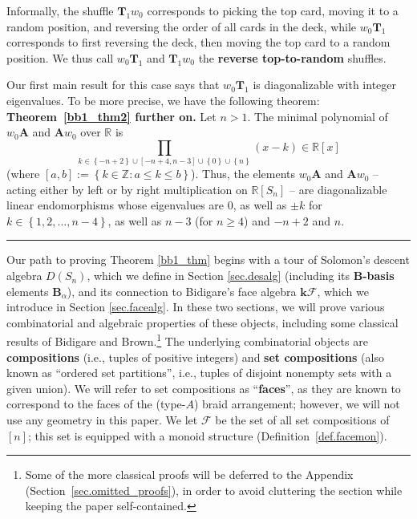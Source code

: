 \documentclass[12pt]{article}
\theoremstyle{definition}%
\newtheorem{thm}{Theorem}[section]
\theoremstyle{definition}%
\theoremstyle{remark}%
\newcommand{\tup}[1]{\left( #1 \right)}
\newcommand{\sbr}[1]{\left[ #1 \right]} %
\newcommand{\interval}[1]{\left[ #1 \right]} %
\newcommand{\set}[1]{\left\{ #1 \right\}}
\newcommand{\ZZ}{\mathbb{Z}}
\newcommand{\RR}{\mathbb{R}}
\newcommand{\kk}{\mathbf{k}}
\newcommand{\kf}{\kk\mathcal{F}}
\newcommand{\dsn}{D\left(S_n\right)}
\newcommand{\A}{\mathbf{A}}
\newcommand{\BBa}{\mathbf{B}_{\alpha}}
\newcommand{\TT}{\mathbf{T}}
\newcommand{\CF}{\mathcal{F}}
\newcommand{\wo}{w_0} %
\newcommand{\defin}[1]{\textbf{#1}}
\newenvironment{thm}[1][Theorem]{\noindent\textbf{#1.} }{\ \rule{0.5em}{0.5em}}
\begin{document}
Informally, the shuffle $\TT_1\wo$ corresponds to picking the top card, moving it to a random position, and reversing the order of all cards in the deck, while $\wo\TT_1$ corresponds to first reversing the deck, then moving the top card to a random position.
We thus call $ \wo\TT_{1} $ and $ \TT_{1}\wo $ the \defin{reverse top-to-random} shuffles.

Our first main result for this case says that $ \wo\TT_1 $ is diagonalizable with integer eigenvalues. To be more precise, we have the following theorem:
\begin{thm}[Theorem~\ref{bb1_thm2} further on]
    \label{bb1_thm}
    Let $n > 1$. The minimal polynomial of $ \wo\A $ and $ \A\wo $ over $\RR$ is
    \begin{equation}
    \label{bb1_thm.eq}
    \prod_{k \in \set{-n+2} \cup \interval{-n+4, n-3} \cup \set{0} \cup \set{n}} \tup{x-k} \in \RR\sbr{x}
    \end{equation}
(where $\interval{a,b} := \set{k \in \ZZ : a \le k \le b}$).
Thus, the elements $\wo\A$ and $\A\wo$ -- acting either by left or by right multiplication on $\RR[S_n]$ -- are diagonalizable linear endomorphisms whose eigenvalues are $0$, as well as $\pm k$ for $k \in \set{1,2,\ldots,n-4}$, as well as $n-3$ (for $n \geq 4$) and $-n+2$ and $n$.
\end{thm}


Our path to proving Theorem \ref{bb1_thm} begins with a tour of Solomon's descent algebra $\dsn$, which we define in Section \ref{sec.desalg} (including its \defin{B-basis} elements $\BBa$), and its connection to Bidigare's face algebra $ \kf $, which we introduce in Section \ref{sec.facealg}.
In these two sections, we will prove various combinatorial and algebraic properties of these objects, including some classical results of Bidigare and Brown.\footnote{Some of the more classical proofs will be deferred to the Appendix (Section~\ref{sec.omitted_proofs}), in order to avoid cluttering the section while keeping the paper self-contained.}
The underlying combinatorial objects are \defin{compositions} (i.e., tuples of positive integers) and \defin{set compositions} (also known as ``ordered set partitions'', i.e., tuples of disjoint nonempty sets with a given union).
We will refer to set compositions as ``\defin{faces}'', as they are known to correspond to the faces of the (type-$A$) braid arrangement; however, we will not use any geometry in this paper.
We let $\CF$ be the set of all set compositions of $\interval{n}$; this set is equipped with a monoid structure (Definition~\ref{def.facemon}).
\end{document}
